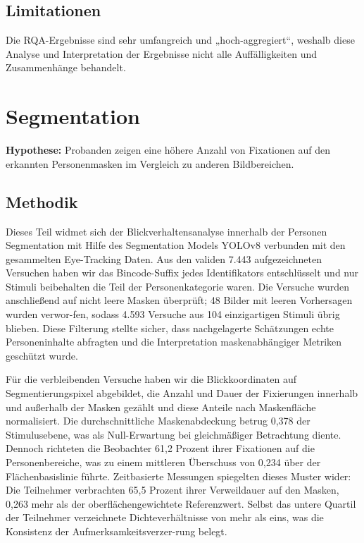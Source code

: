 \documentclass[
    language=german, %
    thesis=seminar, %
    supervisor=postdoc, %
    multiauthor=true, %
    ]{settings/csssa-thesis}
\begin{document}
\subsection{Limitationen}
Die RQA-Ergebnisse sind sehr umfangreich und „hoch-aggregiert“, weshalb diese Analyse und 
Interpretation der Ergebnisse nicht alle Auffälligkeiten und Zusammenhänge behandelt. 

\section{Segmentation}

\textbf{Hypothese:} Probanden zeigen eine höhere Anzahl von Fixationen auf den erkannten Personenmasken im Vergleich zu anderen Bildbereichen.

\subsection{Methodik}
Dieses Teil widmet sich der Blickverhaltensanalyse innerhalb der Personen Segmentation mit Hilfe des Segmentation Models 
YOLOv8 verbunden mit den gesammelten Eye-Tracking Daten. Aus den validen 7.443 aufgezeichneten Versuchen haben wir das 
Bincode-Suffix jedes Identifikators entschlüsselt und nur Stimuli beibehalten die Teil der Personenkategorie waren. 
Die Versuche wurden anschließend auf nicht leere Masken überprüft; 48 Bilder mit leeren Vorhersagen wurden verwor-fen, 
sodass 4.593 Versuche aus 104 einzigartigen Stimuli übrig blieben. Diese Filterung stellte sicher, dass nachgelagerte 
Schätzungen echte Personeninhalte abfragten und die Interpretation maskenabhängiger Metriken geschützt wurde.

Für die verbleibenden Versuche haben wir die Blickkoordinaten auf Segmentierungspixel abgebildet, die Anzahl 
und Dauer der Fixierungen innerhalb und außerhalb der Masken gezählt und diese Anteile nach Maskenfläche normalisiert. 
Die durchschnittliche Maskenabdeckung betrug 0,378 der Stimulusebene, was als Null-Erwartung bei gleichmäßiger 
Betrachtung diente. Dennoch richteten die Beobachter 61,2 Prozent ihrer Fixationen auf die Personenbereiche, 
was zu einem mittleren Überschuss von 0,234 über der Flächenbasislinie führte. Zeitbasierte Messungen spiegelten 
dieses Muster wider: Die Teilnehmer verbrachten 65,5 Prozent ihrer Verweildauer auf den Masken, 0,263 mehr als der 
oberflächengewichtete Referenzwert. Selbst das untere Quartil der Teilnehmer verzeichnete Dichteverhältnisse von 
mehr als eins, was die Konsistenz der Aufmerksamkeitsverzer-rung belegt.
\end{document}

